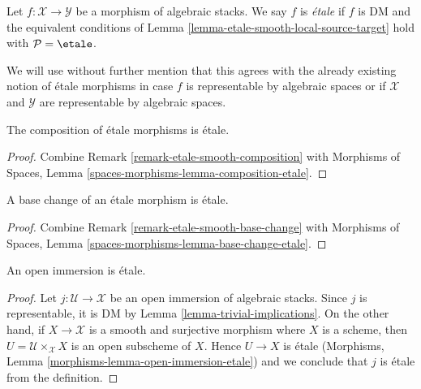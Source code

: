 \begin{definition}
\label{definition-etale}
Let $f : \mathcal{X} \to \mathcal{Y}$ be a morphism of algebraic stacks.
We say $f$ is {\it \'etale} if $f$ is DM and the equivalent conditions of
Lemma \ref{lemma-etale-smooth-local-source-target}
hold with $\mathcal{P} = \etale$.
\end{definition}

\noindent
We will use without further mention that this agrees with the already
existing notion of \'etale morphisms in case $f$ is representable
by algebraic spaces or if $\mathcal{X}$ and $\mathcal{Y}$ are
representable by algebraic spaces.

\begin{lemma}
\label{lemma-composition-etale}
The composition of \'etale morphisms is \'etale.
\end{lemma}

\begin{proof}
Combine Remark \ref{remark-etale-smooth-composition}
with
Morphisms of Spaces, Lemma \ref{spaces-morphisms-lemma-composition-etale}.
\end{proof}

\begin{lemma}
\label{lemma-base-change-etale}
A base change of an \'etale morphism is \'etale.
\end{lemma}

\begin{proof}
Combine
Remark \ref{remark-etale-smooth-base-change}
with
Morphisms of Spaces, Lemma \ref{spaces-morphisms-lemma-base-change-etale}.
\end{proof}

\begin{lemma}
\label{lemma-open-immersion-etale}
An open immersion is \'etale.
\end{lemma}

\begin{proof}
Let $j : \mathcal{U} \to \mathcal{X}$ be an open immersion of
algebraic stacks. Since $j$ is representable, it is DM by
Lemma \ref{lemma-trivial-implications}. On the other hand,
if $X \to \mathcal{X}$ is a smooth and surjective morphism
where $X$ is a scheme, then $U = \mathcal{U} \times_\mathcal{X} X$
is an open subscheme of $X$. Hence $U \to X$ is \'etale
(Morphisms, Lemma \ref{morphisms-lemma-open-immersion-etale})
and we conclude that $j$ is \'etale from the definition.
\end{proof}


